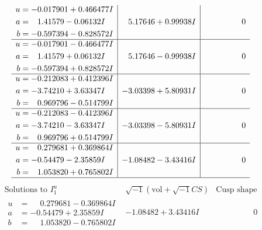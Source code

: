 \documentclass[1p]{elsarticle_modified}
\theoremstyle{definition}
\newcommand{\I}{\sqrt{-1}}
\begin{document}
$$\begin{array}{c|c|c}
\begin{aligned}
u &= -0.017901 + 0.466477 I \\
a &= \phantom{-}1.41579 - 0.06132 I \\
b &= -0.597394 - 0.828572 I\end{aligned}
 & \phantom{-}5.17646 + 0.99938 I & \phantom{-0.000000 } 0 \\ \hline\begin{aligned}
u &= -0.017901 - 0.466477 I \\
a &= \phantom{-}1.41579 + 0.06132 I \\
b &= -0.597394 + 0.828572 I\end{aligned}
 & \phantom{-}5.17646 - 0.99938 I & \phantom{-0.000000 } 0 \\ \hline\begin{aligned}
u &= -0.212083 + 0.412396 I \\
a &= -3.74210 + 3.63347 I \\
b &= \phantom{-}0.969796 - 0.514799 I\end{aligned}
 & -3.03398 + 5.80931 I & \phantom{-0.000000 } 0 \\ \hline\begin{aligned}
u &= -0.212083 - 0.412396 I \\
a &= -3.74210 - 3.63347 I \\
b &= \phantom{-}0.969796 + 0.514799 I\end{aligned}
 & -3.03398 - 5.80931 I & \phantom{-0.000000 } 0 \\ \hline\begin{aligned}
u &= \phantom{-}0.279681 + 0.369864 I \\
a &= -0.54479 - 2.35859 I \\
b &= \phantom{-}1.053820 + 0.765802 I\end{aligned}
 & -1.08482 - 3.43416 I & \phantom{-0.000000 } 0\\
 \hline 
 \end{array}$$\newpage$$\begin{array}{c|c|c}  
\text{Solutions to }I^u_{1}& \I (\text{vol} + \sqrt{-1}CS) & \text{Cusp shape}\\
 \hline 
\begin{aligned}
u &= \phantom{-}0.279681 - 0.369864 I \\
a &= -0.54479 + 2.35859 I \\
b &= \phantom{-}1.053820 - 0.765802 I\end{aligned}
 & -1.08482 + 3.43416 I & \phantom{-0.000000 } 0 \\ \hline\begin{aligned}

\end{aligned}
\end{array}$$
\end{document}

